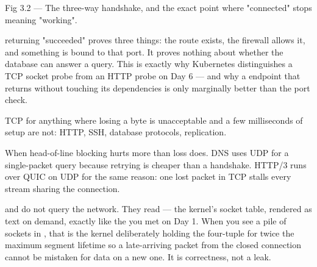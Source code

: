 \begin{wbfigure}{Fig 3.2 — The three-way handshake, and the exact point where "connected" stops meaning "working".}
\end{wbfigure}

\begin{misconception}
 returning "succeeded" proves three things: the route exists, the firewall allows it, and something is bound to that port. It proves nothing about whether the database can answer a query. This is exactly why Kubernetes distinguishes a TCP socket probe from an HTTP probe on Day 6 --- and why a  endpoint that returns  without touching its dependencies is only marginally better than the port check.
\end{misconception}

 TCP for anything where losing a byte is unacceptable and a few milliseconds of setup are not: HTTP, SSH, database protocols, replication.

 When head-of-line blocking hurts more than loss does. DNS uses UDP for a single-packet query because retrying is cheaper than a handshake. HTTP/3 runs over QUIC on UDP for the same reason: one lost packet in TCP stalls every stream sharing the connection.

\begin{behind}
 and  do not query the network. They read  --- the kernel's socket table, rendered as text on demand, exactly like the  you met on Day 1. When you see a pile of sockets in , that is the kernel deliberately holding the four-tuple for twice the maximum segment lifetime so a late-arriving packet from the closed connection cannot be mistaken for data on a new one. It is correctness, not a leak.
\end{behind}

